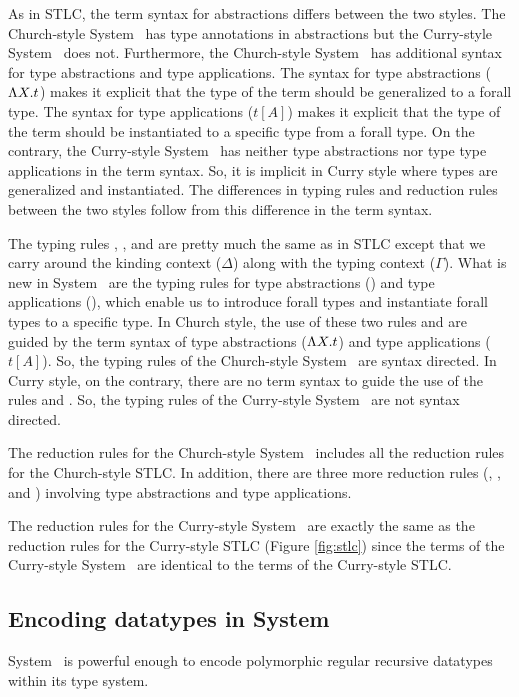 As in STLC, the term syntax for abstractions differs between the two styles.
The Church-style System \F\ has type annotations in abstractions but
the Curry-style System \F\ does not. Furthermore, the Church-style System \F\
has additional syntax for type abstractions and type applications. The syntax
for type abstractions ($\Lambda X.t$) makes it explicit that the type of the term
should be generalized to a forall type. The syntax for type applications
($t[A]$) makes it explicit that the type of the term should be instantiated to
a specific type from a forall type. On the contrary, the Curry-style System \F\
has neither type abstractions nor type type applications in the term syntax.
So, it is implicit in Curry style where types are generalized and instantiated.
The differences in typing rules and reduction rules between the two styles
follow from this difference in the term syntax.

The typing rules , , and  are
pretty much the same as in STLC except that we carry around the kinding context
($\Delta$) along with the typing context ($\Gamma$). What is new in System \F\
are the typing rules for type abstractions () and
type applications (\rulename{TyApp}), which enable us to introduce
forall types and instantiate forall types to a specific type.
In Church style, the use of these two rules \rulename{TyAbs} and
\rulename{TyAbs} are guided by the term syntax of type abstractions
($\Lambda X.t$) and type applications ($t[A]$). So, the typing rules of
the Church-style System \F\ are syntax directed. In Curry style,
on the contrary, there are no term syntax to guide the use of the rules
\rulename{TyAbs} and \rulename{TyApp}. So, the typing rules of
the Curry-style System \F\ are not syntax directed.

The reduction rules for the Church-style System \F\ includes all
the reduction rules for the Church-style STLC. In addition,  there
are three more reduction rules (, ,
and \rulename{RedTyApp}) involving type abstractions and type applications.

The reduction rules for the Curry-style System \F\ are exactly the same as
the reduction rules for the Curry-style STLC (Figure \ref{fig:stlc}) since
the terms of the Curry-style System \F\ are identical to 
the terms of the Curry-style STLC.

\subsection{Encoding datatypes in System \F}
\label{sec:f:data}
System \F\ is  powerful enough to encode polymorphic regular recursive datatypes
within its type system.

